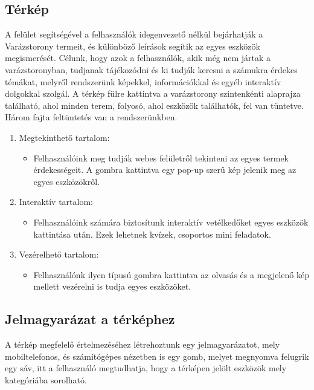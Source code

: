 \documentclass[
]{thesis-ekf}
\theoremstyle{definition}
\theoremstyle{remark}
\begin{document}
		\subsection{Térkép}
			\par A felület segítségével a felhasználók idegenvezető nélkül bejárhatják a Varázstorony termeit, és különböző leírások segítik az egyes eszközök megismerését. Célunk, hogy azok a felhasználók, akik még nem jártak a varázstoronyban, tudjanak tájékozódni és ki tudják keresni a számukra érdekes témákat, melyről rendszerünk képekkel, információkkal és egyéb interaktív dolgokkal szolgál. A térkép fülre kattintva a varázstorony szintenkénti alaprajza található, ahol minden terem, folyosó, ahol eszközök találhatók, fel van tüntetve. Három fajta feltüntetés van a rendszerünkben.
			\par
			\begin{enumerate}
				\item Megtekinthető tartalom:
				\begin{itemize}
					\item Felhasználóink meg tudják webes felületről tekinteni az egyes termek érdekességeit. A gombra kattintva egy pop-up szerű kép jelenik meg az egyes eszközökről.
				\end{itemize}
				\item Interaktív tartalom:
				\begin{itemize}
					\item Felhasználóink számára biztosítunk interaktív vetélkedőket egyes eszközök kattintása után. Ezek lehetnek kvízek, csoportos mini feladatok. 
				\end{itemize}
				\item Vezérelhető tartalom:
				\begin{itemize}
					\item Felhasználónk ilyen típusú gombra kattintva az olvasás és a megjelenő kép mellett vezérelni is tudja egyes eszközöket.
				\end{itemize}
			\end{enumerate}
		\subsection{Jelmagyarázat a térképhez}
		A térkép megfelelő értelmezéséhez létrehoztunk egy jelmagyarázatot, mely mobiltelefonos, és számítógépes nézetben is egy gomb, melyet megnyomva felugrik egy sáv, itt a felhasználó megtudhatja, hogy a térképen jelölt eszközök mely kategóriába sorolható. 
			
\end{document}
